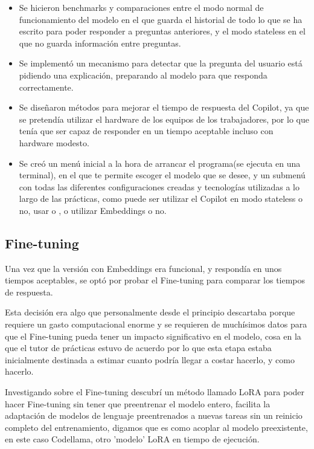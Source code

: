 \begin{itemize}
    \item Se hicieron benchmarks y comparaciones entre el modo normal de funcionamiento del modelo en el que guarda el historial de todo lo que se ha escrito para poder responder a preguntas anteriores, y el modo stateless en el que no guarda información entre preguntas.
    \item Se implementó un mecanismo para detectar que la pregunta del usuario está pidiendo una explicación, preparando al modelo para que responda correctamente.
    \item Se diseñaron métodos para mejorar el tiempo de respuesta del Copilot, ya que se pretendía utilizar el hardware de los equipos de los trabajadores, por lo que tenía que ser capaz de responder en un tiempo aceptable incluso con hardware modesto.
    \item Se creó un menú inicial a la hora de arrancar el programa(se ejecuta en una terminal), en el que te permite escoger el modelo \href{https://en.wikipedia.org/wiki/Large_language_model}{} que se desee, y un submenú con todas las diferentes configuraciones creadas y tecnologías utilizadas a lo largo de las prácticas, como puede ser utilizar el Copilot en modo stateless o no, usar \href{https://www.postgresql.org/}{} o \href{https://www.sqlite.org/}{}, o utilizar Embeddings o no. 
\end{itemize}

\subsection{Fine-tuning}

Una vez que la versión con Embeddings era funcional, y respondía en unos tiempos aceptables, se optó por probar el Fine-tuning para comparar los tiempos de respuesta.

Esta decisión era algo que personalmente desde el principio descartaba porque requiere un gasto computacional enorme y se requieren de muchísimos datos para que el Fine-tuning pueda tener un impacto significativo en el modelo, cosa en la que el tutor de prácticas estuvo de acuerdo por lo que esta etapa estaba inicialmente destinada a estimar cuanto podría llegar a costar hacerlo, y como hacerlo.

Investigando sobre el Fine-tuning descubrí un método llamado LoRA para poder hacer Fine-tuning sin tener que preentrenar el modelo \href{https://en.wikipedia.org/wiki/Large_language_model}{} entero, facilita la adaptación de modelos de lenguaje preentrenados a nuevas tareas sin un reinicio completo del entrenamiento, digamos que es como acoplar al modelo preexistente, en este caso Codellama, otro 'modelo' LoRA en tiempo de ejecución.

